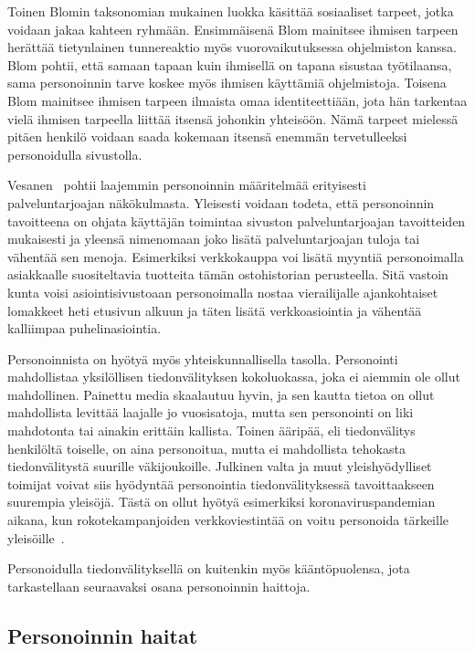 \documentclass[finnish, 12pt, a4paper, elec, utf8, a-1b, online]{aaltothesis}
\begin{document}
Toinen Blomin taksonomian mukainen luokka käsittää sosiaaliset tarpeet, jotka
voidaan jakaa kahteen ryhmään. Ensimmäisenä Blom mainitsee ihmisen tarpeen
herättää tietynlainen tunnereaktio myös vuorovaikutuksessa ohjelmiston kanssa.
Blom pohtii, että samaan tapaan kuin ihmisellä on tapana sisustaa työtilaansa,
sama personoinnin tarve koskee myös ihmisen käyttämiä ohjelmistoja. Toisena Blom
mainitsee ihmisen tarpeen ilmaista omaa identiteettiään, jota hän tarkentaa
vielä ihmisen tarpeella liittää itsensä johonkin yhteisöön. Nämä tarpeet
mielessä pitäen henkilö voidaan saada kokemaan itsensä enemmän tervetulleeksi
personoidulla sivustolla.

Vesanen~\cite{10.1108/03090560710737534} pohtii laajemmin personoinnin
määritelmää erityisesti palveluntarjoajan näkökulmasta. Yleisesti voidaan
todeta, että personoinnin tavoitteena on ohjata käyttäjän toimintaa sivuston
palveluntarjoajan tavoitteiden mukaisesti ja yleensä nimenomaan joko lisätä
palveluntarjoajan tuloja tai vähentää sen menoja. Esimerkiksi verkkokauppa voi
lisätä myyntiä personoimalla asiakkaalle suositeltavia tuotteita tämän
ostohistorian perusteella. Sitä vastoin kunta voisi asiointisivustoaan
personoimalla nostaa vierailijalle ajankohtaiset lomakkeet heti etusivun alkuun
ja täten lisätä verkkoasiointia ja vähentää kalliimpaa puhelinasiointia.

Personoinnista on hyötyä myös yhteiskunnallisella tasolla. Personointi
mahdollistaa yksilöllisen tiedonvälityksen kokoluokassa, joka ei aiemmin ole
ollut mahdollinen. Painettu media skaalautuu hyvin, ja sen kautta tietoa on
ollut mahdollista levittää laajalle jo vuosisatoja, mutta sen personointi on
liki mahdotonta tai ainakin erittäin kallista. Toinen ääripää, eli tiedonvälitys
henkilöltä toiselle, on aina personoitua, mutta ei mahdollista tehokasta
tiedonvälitystä suurille väkijoukoille. Julkinen valta ja muut yleishyödylliset
toimijat voivat siis hyödyntää personointia tiedonvälityksessä tavoittaakseen
suurempia yleisöjä. Tästä on ollut hyötyä esimerkiksi koronaviruspandemian
aikana, kun rokotekampanjoiden verkkoviestintää on voitu personoida tärkeille
yleisöille~\cite{sanchez_2022}.

Personoidulla tiedonvälityksellä on kuitenkin myös kääntöpuolensa, jota
tarkastellaan seuraavaksi osana personoinnin haittoja.

\subsection{Personoinnin haitat}\label{personalization-cons}
\end{document}
